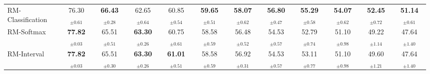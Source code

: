 \documentclass{article}
\theoremstyle{remark}
\begin{document}
\begin{table}[H]
{\begin{tabular}{lccccccccccc}
RM-Classification & 76.30$_{\pm0.61}$ & \textbf{66.43}$_{\pm0.28}$ & 62.65$_{\pm0.64}$ & 60.85$_{\pm0.54}$ & \textbf{59.65}$_{\pm0.51}$ & \textbf{58.07}$_{\pm0.62}$ & \textbf{56.80}$_{\pm0.47}$ & \textbf{55.29}$_{\pm0.58}$ & \textbf{54.07}$_{\pm0.62}$ & \textbf{52.45}$_{\pm0.72}$ & \textbf{51.14}$_{\pm0.61}$ \\
RM-Softmax & \textbf{77.82}$_{\pm0.03}$ & 65.51$_{\pm0.51}$ & \textbf{63.30}$_{\pm0.26}$ & 60.75$_{\pm0.61}$ & 58.58$_{\pm0.59}$ & 56.48$_{\pm0.52}$ & 54.53$_{\pm0.57}$ & 52.79$_{\pm0.74}$ & 51.10$_{\pm0.98}$ & 49.22$_{\pm1.14}$ & 47.64$_{\pm1.40}$ \\ \hdashline
RM-Interval & \textbf{77.82}$_{\pm0.03}$ & 65.51$_{\pm0.30}$ & \textbf{63.30}$_{\pm0.26}$ & \textbf{61.01}$_{\pm0.51}$ & 58.58$_{\pm0.59}$ & 56.92$_{\pm0.31}$ & 54.53$_{\pm0.57}$ & 53.11$_{\pm0.77}$ & 51.10$_{\pm0.98}$ & 49.60$_{\pm1.21}$ & 47.64$_{\pm1.40}$ \\
\bottomrule
\end{tabular}
}
\end{table}
\end{document}
